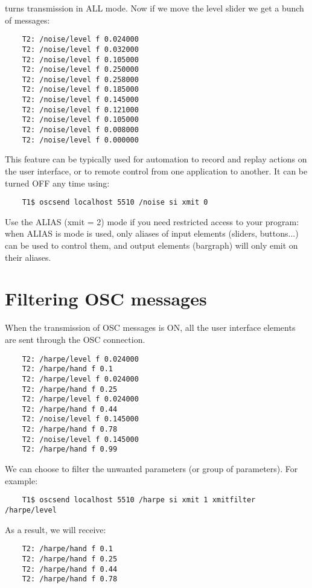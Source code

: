 turns transmission in ALL mode. Now if we move the level slider we get a bunch of messages:

\begin{lstlisting}
	T2: /noise/level f 0.024000
	T2: /noise/level f 0.032000
	T2: /noise/level f 0.105000
	T2: /noise/level f 0.250000
	T2: /noise/level f 0.258000
	T2: /noise/level f 0.185000
	T2: /noise/level f 0.145000
	T2: /noise/level f 0.121000
	T2: /noise/level f 0.105000
	T2: /noise/level f 0.008000
	T2: /noise/level f 0.000000
\end{lstlisting}

This feature can be typically used for automation to record and replay actions on the user interface, or to remote control from one application to another. It can be turned OFF any time using:

\begin{lstlisting}
	T1$ oscsend localhost 5510 /noise si xmit 0
\end{lstlisting}

Use the ALIAS (xmit = 2) mode if you need restricted access to your program: when ALIAS is mode is used, only aliases of input elements (sliders, buttons...) can be used to control them, and output elements (bargraph) will only emit on their aliases.

\section{Filtering OSC messages}

When the transmission of OSC messages is ON, all the user interface elements are sent through the OSC connection.  

\begin{lstlisting}
	T2: /harpe/level f 0.024000
	T2: /harpe/hand f 0.1
	T2: /harpe/level f 0.024000
	T2: /harpe/hand f 0.25
	T2: /harpe/level f 0.024000
	T2: /harpe/hand f 0.44
	T2: /noise/level f 0.145000
	T2: /harpe/hand f 0.78
	T2: /noise/level f 0.145000
	T2: /harpe/hand f 0.99
\end{lstlisting}

We can choose to filter the unwanted parameters (or group of parameters).  For example:
\begin{lstlisting}
	T1$ oscsend localhost 5510 /harpe si xmit 1 xmitfilter /harpe/level
\end{lstlisting}

As a result, we will receive:
\begin{lstlisting}
	T2: /harpe/hand f 0.1
	T2: /harpe/hand f 0.25
	T2: /harpe/hand f 0.44
	T2: /harpe/hand f 0.78
\end{lstlisting}

